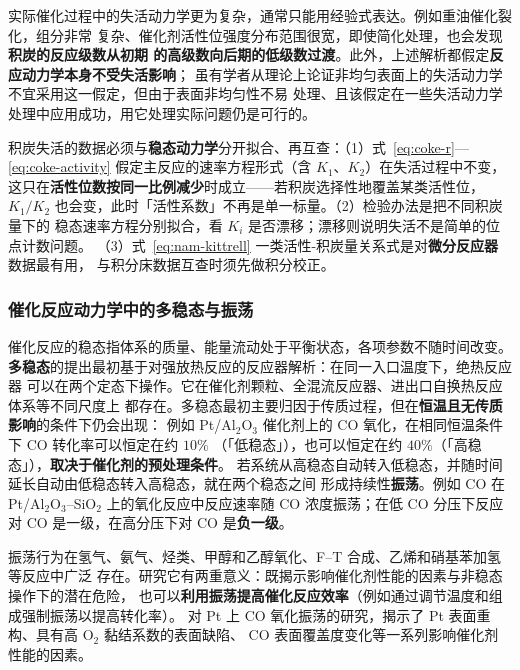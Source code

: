 实际催化过程中的失活动力学更为复杂，通常只能用经验式表达。例如重油催化裂化，组分非常
复杂、催化剂活性位强度分布范围很宽，即使简化处理，也会发现\textbf{积炭的反应级数从初期
的高级数向后期的低级数过渡}。此外，上述解析都假定\textbf{反应动力学本身不受失活影响}；
虽有学者从理论上论证非均匀表面上的失活动力学不宜采用这一假定，但由于表面非均匀性不易
处理、且该假定在一些失活动力学处理中应用成功，用它处理实际问题仍是可行的。

\begin{crosscheck}
积炭失活的数据必须与\textbf{稳态动力学}分开拟合、再互查：（1）式~\eqref{eq:coke-r}—
\eqref{eq:coke-activity} 假定主反应的速率方程形式（含 $K_1$、$K_2$）在失活过程中不变，
这只在\textbf{活性位数按同一比例减少}时成立——若积炭选择性地覆盖某类活性位，
$K_1/K_2$ 也会变，此时「活性系数」不再是单一标量。（2）检验办法是把不同积炭量下的
稳态速率方程分别拟合，看 $K_i$ 是否漂移；漂移则说明失活不是简单的位点计数问题。
（3）式~\eqref{eq:nam-kittrell} 一类活性-积炭量关系式是对\textbf{微分反应器}数据最有用，
与积分床数据互查时须先做积分校正。
\end{crosscheck}

\subsubsection{催化反应动力学中的多稳态与振荡}

催化反应的稳态指体系的质量、能量流动处于平衡状态，各项参数不随时间改变。
\textbf{多稳态}的提出最初基于对强放热反应的反应器解析：在同一入口温度下，绝热反应器
可以在两个定态下操作。它在催化剂颗粒、全混流反应器、进出口自换热反应体系等不同尺度上
都存在。多稳态最初主要归因于传质过程，但在\textbf{恒温且无传质影响}的条件下仍会出现：
例如 Pt/Al$_2$O$_3$ 催化剂上的 CO 氧化，在相同恒温条件下 CO 转化率可以恒定在约 $10\%$
（「低稳态」），也可以恒定在约 $40\%$（「高稳态」），\textbf{取决于催化剂的预处理条件}。
若系统从高稳态自动转入低稳态，并随时间延长自动由低稳态转入高稳态，就在两个稳态之间
形成持续性\textbf{振荡}。例如 CO 在 Pt/Al$_2$O$_3$–SiO$_2$ 上的氧化反应中反应速率随
CO 浓度振荡；在低 CO 分压下反应对 CO 是一级，在高分压下对 CO 是\textbf{负一级}。

振荡行为在氢气、氨气、烃类、甲醇和乙醇氧化、F–T 合成、乙烯和硝基苯加氢等反应中广泛
存在。研究它有两重意义：既揭示影响催化剂性能的因素与非稳态操作下的潜在危险，
也可以\textbf{利用振荡提高催化反应效率}（例如通过调节温度和组成强制振荡以提高转化率）。
对 Pt 上 CO 氧化振荡的研究，揭示了 Pt 表面重构、具有高 O$_2$ 黏结系数的表面缺陷、
CO 表面覆盖度变化等一系列影响催化剂性能的因素。

